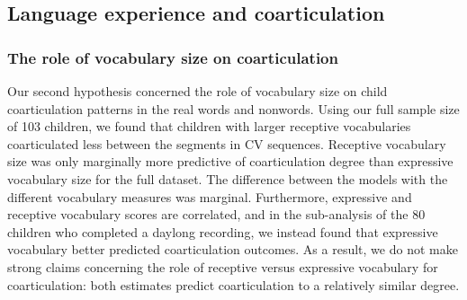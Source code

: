 \documentclass[a4paper,man,natbib,donotrepeattitle, apacite]{apa6}
\begin{document}
\subsection{Language experience and coarticulation}

\subsubsection{The role of vocabulary size on coarticulation}

Our second hypothesis concerned the role of vocabulary size on child coarticulation patterns in the real words and nonwords. Using our full sample size of 103 children, we found that children with larger receptive vocabularies coarticulated less between the segments in CV sequences. Receptive vocabulary size was only marginally more predictive of coarticulation degree than expressive vocabulary size for the full dataset. The difference between the models with the different vocabulary measures was marginal. Furthermore, expressive and receptive vocabulary scores are correlated, and in the sub-analysis of the 80 children who completed a daylong recording, we instead found that expressive vocabulary better predicted coarticulation outcomes. As a result, we do not make strong claims concerning the role of receptive versus expressive vocabulary for coarticulation: both estimates predict coarticulation to a relatively similar degree.
\end{document}
